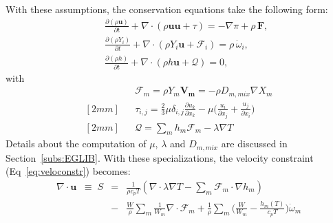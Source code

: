 With these assumptions, the conservation equations take the following form:
\begin{eqnarray}
&&\frac{\partial (\rho \boldsymbol{u})}{\partial t} + 
\nabla \cdot \left(\rho  \boldsymbol{u} \boldsymbol{u} + \tau \right)
= -\nabla \pi + \rho \, \boldsymbol{F}  ,
\nonumber
\\
&&\frac{\partial (\rho Y_i)}{\partial t} +
\nabla \cdot \left( \rho Y_i \boldsymbol{u} + \boldsymbol{\mathcal{F}}_{i} \right)
= \rho \, \dot{\omega}_i,
\label{eq:pelelm}
\\
&&\frac{ \partial (\rho h)}{ \partial t} +
\nabla \cdot \left( \rho h \boldsymbol{u} + \boldsymbol{\mathcal{Q}} \right) = 0 ,
\nonumber
\end{eqnarray}
with
 \begin{eqnarray*}
&&\boldsymbol{\mathcal{F}}_{m} = \rho Y_m \boldsymbol{V_m} = - \rho D_{m,mix} \nabla X_m
\\ [2mm]
&&\tau_{i,j} = \frac{2}{3} \mu \delta_{i,j} \frac{\partial {u_k}}{\partial x_k} - \mu \Big(\frac{u_i}{\partial x_j} + \frac{u_j}{\partial x_i}\Big)
\\ [2mm]
&&\boldsymbol{\mathcal{Q}} =  \sum_m h_m \boldsymbol{\mathcal{F}}_{m}  - \lambda \nabla T
\end{eqnarray*}
Details about the computation of $\mu$, $\lambda$ and $D_{m,mix}$ are discussed in Section~\ref{subs:EGLIB}.
With these specializations, the velocity constraint (Eq~\ref{eq:veloconstr}) becomes:
\begin{eqnarray}
\nabla \cdot \boldsymbol{u} \;\;  \equiv \; S&=& \frac{1}{\rho c_{p} T}(\nabla \cdot \lambda \nabla T - \sum_m  \boldsymbol{\mathcal{F}}_{m} \cdot \nabla h_m) \nonumber
\\
&-& \frac{W}{\rho} \sum_m \frac{1}{W_m} \nabla \cdot \boldsymbol{\mathcal{F}}_{m} + \frac{1}{\rho} \sum_m \Big( \frac{W}{W_m} -\frac{h_m(T)}{c_{p} T} \Big)\dot{\omega}_m
\end{eqnarray}



